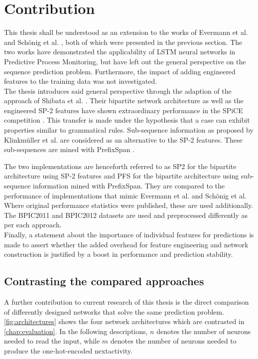 \chapter{Contribution}\label{sec:contribution}

This thesis shall be understood as an extension to the works of Evermann et al. \cite{evermann2016} and Schönig et al. \cite{schoenig2018}, both of which were presented in the previous section. The two works have demonstrated the applicability of LSTM neural networks in Predictive Process Monitoring, but have left out the general perspective on the sequence prediction problem. Furthermore, the impact of adding engineered features to the training data was not investigated.\\

The thesis introduces said general perspective through the adaption of the approach of Shibata et al. \cite{shibata2016bipartite}. Their bipartite network architecture as well as the engineered SP-2 features have shown extraordinary performance in the SPiCE competition \cite{web:spice}. This transfer is made under the hypothesis that a case can exhibit properties similar to grammatical rules. Sub-sequence information as proposed by Klinkmüller et al. \cite{klinkmuller2018reliablemonitoring} are considered as an alternative to the SP-2 features. These sub-sequences are mined with PrefixSpan \cite{pei2001prefixspan}.

The two implementations are henceforth referred to as SP2 for the bipartite architecture using SP-2 features and PFS for the bipartite architecture using sub-sequence information mined with PrefixSpan. They are compared to the performance of implementations that mimic Evermann et al. and Schönig et al. Where original performance statistics were published, these are used additionally. The BPIC2011 \cite{BPIC2011} and BPIC2012 \cite{BPIC2012} datasets are used and preprocessed differently as per each approach.\\

Finally, a statement about the importance of individual features for predictions is made to assert whether the added overhead for feature engineering and network construction is justified by a boost in performance and prediction stability.

\section{Contrasting the compared approaches}
A further contribution to current research of this thesis is the direct comparison of differently designed networks that solve the same prediction problem. \autoref{fig:architectures} shows the four network architectures which are contrasted in \autoref{chap:evaluation}. In the following descriptions, $n$ denotes the number of neurons needed to read the input, while $m$ denotes the number of neurons needed to produce the one-hot-encoded nextactivity.\\

